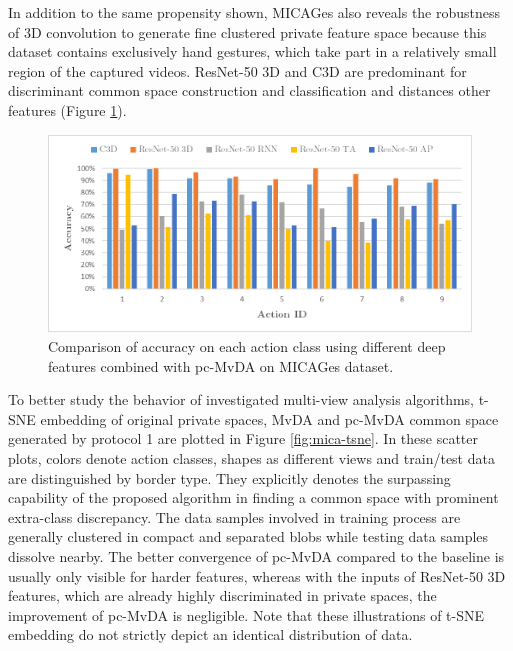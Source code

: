     In addition to the same propensity shown, MICAGes also reveals the robustness of 3D convolution to generate fine clustered private feature space because this dataset contains exclusively hand gestures, which take part in a relatively small region of the captured videos. ResNet-50 3D and C3D are predominant for discriminant common space construction and classification and distances other features (Figure \ref{fig:pc-MvDA_confusion_mica}).

    \begin{figure}[htbp]
        \centering
        \includegraphics[width=0.8\linewidth]{figs/pc-MvDA_confusion_mica.png}
        \caption{Comparison of accuracy on each action class using different deep features combined with pc-MvDA on MICAGes dataset.}
        \label{fig:pc-MvDA_confusion_mica}
    \end{figure}

    To better study the behavior of investigated multi-view analysis algorithms, t-SNE embedding of original private spaces, MvDA and pc-MvDA common space generated by protocol 1 are plotted in Figure \ref{fig:mica-tsne}. In these scatter plots, colors denote action classes, shapes as different views and train/test data are distinguished by border type. They explicitly denotes the surpassing capability of the proposed algorithm in finding a common space with prominent extra-class discrepancy. The data samples involved in training process are generally clustered in compact and separated blobs while testing data samples dissolve nearby. The better convergence of pc-MvDA compared to the baseline is usually only visible for harder features, whereas with the inputs of ResNet-50 3D features, which are already highly discriminated in private spaces, the improvement of pc-MvDA is negligible. Note that these illustrations of t-SNE embedding do not strictly depict an identical distribution of data.

